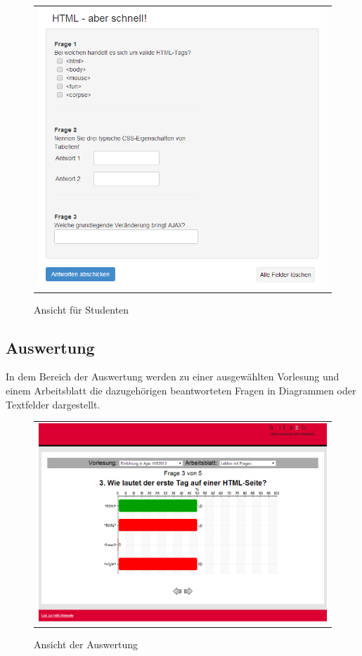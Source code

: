 \begin{figure} [!htb]
	\begin{center}
		  \begin{tabular}{@{}r@{}}
			{\includegraphics[width=36.6em]{images/Studentenansicht.png}}\\ 
 	 	 \end{tabular}
		\caption{Ansicht für Studenten}
		\label{fig:Studentenansicht}
	\end{center} 
\end{figure}\FloatBarrier

\subsection{Auswertung}
In dem Bereich der Auswertung werden zu einer ausgewählten Vorlesung und einem
Arbeitsblatt die dazugehörigen beantworteten Fragen in Diagrammen oder
Textfelder dargestellt.

\begin{figure} [!htb]
	\begin{center}
		  \begin{tabular}{@{}r@{}}
			{\includegraphics[width=36.6em]{images/Auswertung.png}}\\
 	 	 \end{tabular}
		\caption{Ansicht der Auswertung}
		\label{fig:Auswertung}
	\end{center} 
\end{figure}\FloatBarrier


